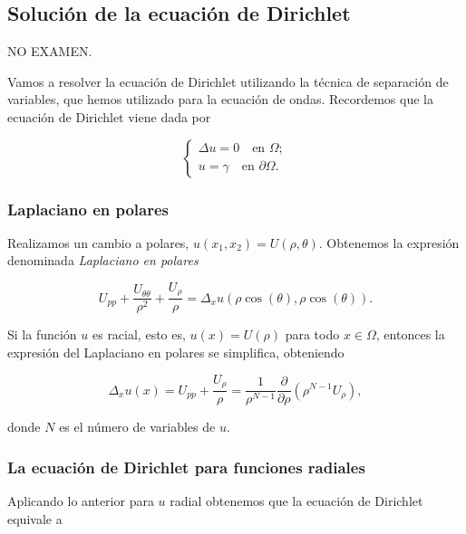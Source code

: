 \documentclass{article}
\begin{document}
\subsection{Solución de la ecuación de Dirichlet}

NO EXAMEN.

Vamos a resolver la ecuación de Dirichlet utilizando la técnica de separación de variables, que
hemos utilizado para la ecuación de ondas. Recordemos que la ecuación de Dirichlet viene dada por

\begin{equation}
  \label{eq:dirichlet}
  \begin{cases}
    \Delta u = 0 \quad \text{en } \Omega; \\
    u = \gamma \quad \text{en } \partial \Omega.
  \end{cases}
\end{equation}

\subsubsection{Laplaciano en polares}

Realizamos un cambio a polares, $u(x_1,x_2) = U(\rho, \theta)$. Obtenemos la expresión denominada
\emph{Laplaciano en polares}

\begin{equation}
  \label{eq:laplaciano:polares}
  U_{pp} + \frac{U_{\theta\theta}}{\rho^2} + \frac{U_{\rho}}{\rho} = \Delta_x u(\rho \cos(\theta), \rho \cos(\theta)).
\end{equation}

Si la función $u$ es racial, esto es, $u(x) = U(\rho)$ para todo $x \in \Omega$, entonces la
expresión del Laplaciano en polares se simplifica, obteniendo

\begin{equation}
  \label{eq:laplaciano:radial}
  \Delta_x u(x) = U_{pp} + \frac{U_{\rho}}{\rho} = \frac{1}{\rho^{N-1}} \frac{\partial}{\partial \rho}(\rho^{N-1} U_{\rho}),
\end{equation}

donde $N$ es el número de variables de $u$.

\subsubsection{La ecuación de Dirichlet para funciones radiales}

Aplicando lo anterior para $u$ radial obtenemos que la ecuación de Dirichlet equivale a
\end{document}
